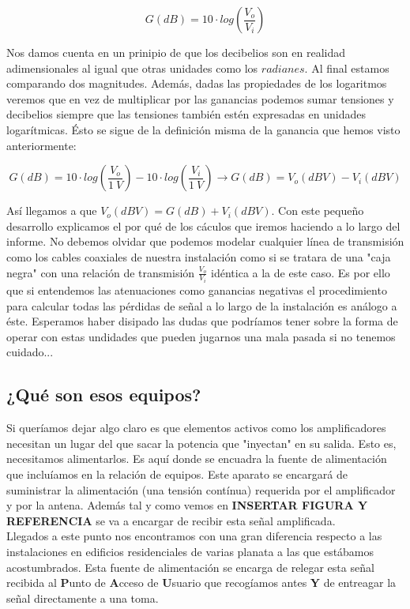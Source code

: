 \documentclass{article}[12 pt]
\begin{document}
			$$G(dB) = 10 \cdot log(\frac{V_o}{V_i})$$

			Nos damos cuenta en un prinipio de que los decibelios son en realidad adimensionales al igual que otras unidades como los $radianes$. Al final estamos comparando dos magnitudes. Además, dadas las propiedades de los logaritmos veremos que en vez de multiplicar por las ganancias podemos sumar tensiones y decibelios siempre que las tensiones también estén expresadas en unidades logarítmicas. Ésto se sigue de la definición misma de la ganancia que hemos visto anteriormente:

			$$G(dB) = 10 \cdot log(\frac{V_o}{1\ V}) - 10 \cdot log(\frac{V_i}{1\ V}) \rightarrow G(dB) = V_o(dBV) - V_i(dBV)$$

			Así llegamos a que $V_o(dBV) = G(dB) + V_i(dBV)$. Con este pequeño desarrollo explicamos el por qué de los cáculos que iremos haciendo a lo largo del informe. No debemos olvidar que podemos modelar cualquier línea de transmisión como los cables coaxiales de nuestra instalación como si se tratara de una "caja negra" con una relación de transmisión $\frac{V_o}{V_i}$ idéntica a la de este caso. Es por ello que si entendemos las atenuaciones como ganancias negativas el procedimiento para calcular todas las pérdidas de señal a lo largo de la instalación es análogo a éste. Esperamos haber disipado las dudas que podríamos tener sobre la forma de operar con estas undidades que pueden jugarnos una mala pasada si no tenemos cuidado...\\

		\subsection{¿Qué son esos equipos?}
			Si queríamos dejar algo claro es que elementos activos como los amplificadores necesitan un lugar del que sacar la potencia que "inyectan" en su salida. Esto es, necesitamos alimentarlos. Es aquí donde se encuadra la fuente de alimentación que incluíamos en la relación de equipos. Este aparato se encargará de suministrar la alimentación (una tensión contínua) requerida por el amplificador y por la antena. Además tal y como vemos en \textbf{INSERTAR FIGURA Y REFERENCIA} se va a encargar de recibir esta señal amplificada.\\

			Llegados a este punto nos encontramos con una gran diferencia respecto a las instalaciones en edificios residenciales de varias planata a las que estábamos acostumbrados. Esta fuente de alimentación se encarga de relegar esta señal recibida al \textbf{P}unto de \textbf{A}cceso de \textbf{U}suario que recogíamos antes \textbf{Y} de entreagar la señal directamente a una toma.\\
\end{document}
